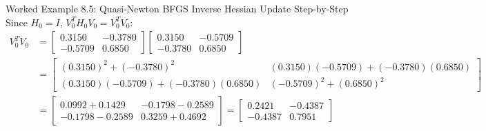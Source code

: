 \begin{examplebox}[breakable]{Worked Example 8.5: Quasi-Newton BFGS Inverse Hessian Update Step-by-Step}
\begin{equation*}
\end{equation*}
Since $H_0 = I$, $V_0^T H_0 V_0 = V_0^T V_0$:
\begin{align*}
V_0^T V_0 &= \begin{bmatrix} 0.3150 & -0.3780 \\ -0.5709 & 0.6850 \end{bmatrix} \begin{bmatrix} 0.3150 & -0.5709 \\ -0.3780 & 0.6850 \end{bmatrix} \\
&= \begin{bmatrix} (0.3150)^2 + (-0.3780)^2 & (0.3150)(-0.5709) + (-0.3780)(0.6850) \\ (0.3150)(-0.5709) + (-0.3780)(0.6850) & (-0.5709)^2 + (0.6850)^2 \end{bmatrix} \\
&= \begin{bmatrix} 0.0992 + 0.1429 & -0.1798 - 0.2589 \\ -0.1798 - 0.2589 & 0.3259 + 0.4692 \end{bmatrix} = \mathbf{\begin{bmatrix} 0.2421 & -0.4387 \\ -0.4387 & 0.7951 \end{bmatrix}}
\end{align*}


\end{examplebox}
